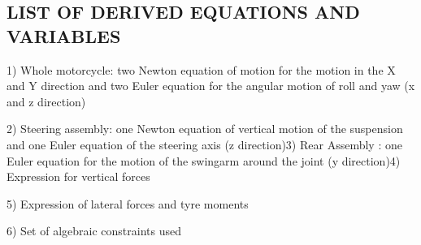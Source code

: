 \documentclass{article}
\begin{document}
\subsection{\textbf{LIST OF DERIVED EQUATIONS AND VARIABLES}}
\begin{maplegroup}
\begin{Maple Normal}{
1) Whole motorcycle: two Newton equation of motion for the motion in the X and Y direction and two Euler equation for the angular motion of roll and yaw (x and z direction)}\end{Maple Normal}

\begin{Maple Normal}{
2) Steering assembly: one Newton equation of vertical motion of the suspension and one Euler equation of the steering axis (z direction)3) Rear Assembly :    one Euler equation for the motion of the swingarm around the joint (y direction)4) Expression for vertical forces}\end{Maple Normal}

\begin{Maple Normal}{
5) Expression of lateral forces and tyre moments}\end{Maple Normal}

\begin{Maple Normal}{
6) Set of algebraic constraints used}\end{Maple Normal}
\end{maplegroup}
\begin{maplegroup}
\begin{mapleinput}
\end{mapleinput}
\end{maplegroup}
\end{document}
